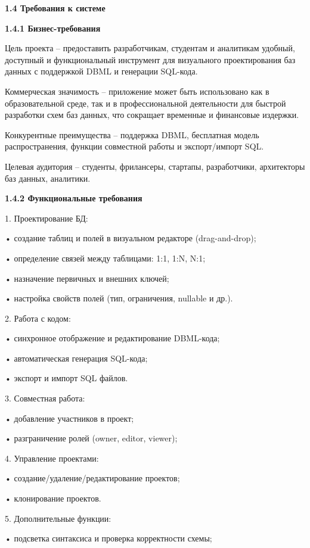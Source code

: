 \textbf{1.4 Требования к системе}

\textbf{1.4.1 Бизнес-требования}

	Цель проекта – предоставить разработчикам, студентам и аналитикам удобный, доступный и функциональный инструмент для визуального проектирования баз данных с поддержкой DBML и генерации SQL-кода.
    
	Коммерческая значимость – приложение может быть использовано как в образовательной среде, так и в профессиональной деятельности для быстрой разработки схем баз данных, что сокращает временные и финансовые издержки.
    
	Конкурентные преимущества – поддержка DBML, бесплатная модель распространения, функции совместной работы и экспорт/импорт SQL.
    
	Целевая аудитория – студенты, фрилансеры, стартапы, разработчики, архитекторы баз данных, аналитики.

\textbf{1.4.2 Функциональные требования }

	1.	Проектирование БД:
    
	•	создание таблиц и полей в визуальном редакторе (drag-and-drop);
    
	•	определение связей между таблицами: 1:1, 1:N, N:1;
    
	•	назначение первичных и внешних ключей;
    
	•	настройка свойств полей (тип, ограничения, nullable и др.).
    
	2.	Работа с кодом:
    
	•	синхронное отображение и редактирование DBML-кода;
    
	•	автоматическая генерация SQL-кода;
    
	•	экспорт и импорт SQL файлов.
    
	3.	Совместная работа:
    
	•	добавление участников в проект;
    
	•	разграничение ролей (owner, editor, viewer);
    
	4.	Управление проектами:
    
	•	создание/удаление/редактирование проектов;
    
	•	клонирование проектов.
    
	5.	Дополнительные функции:
    
	•	подсветка синтаксиса и проверка корректности схемы;
    

